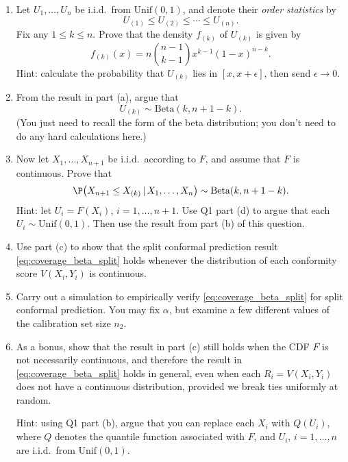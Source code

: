 \documentclass{article}
\begin{document}
\begin{enumerate}[label=(\alph*)]
\item Let $U_1,\dots,U_n$ be i.i.d.\ from $\mathrm{Unif}(0,1)$, and denote their
  \emph{order statistics} by  
  \[
  U_{(1)} \leq U_{(2)} \leq \cdots \leq U_{(n)}.
  \]
  Fix any $1 \leq k \leq n$. Prove that the density $f_{(k)}$ of $U_{(k)}$ is
  given by 
  \marginpar{\small [4 pts]}
  \[
  f_{(k)}(x) = n {n-1 \choose k-1} x^{k-1} (1-x)^{n-k}.
  \]
  Hint: calculate the probability that $U_{(k)}$ lies in $[x,x+\epsilon]$, then
  send $\epsilon \to 0$.
  
\item From the result in part (a), argue that 
  \marginpar{\small [1 pt]}
  \[
  U_{(k)} \sim \mathrm{Beta}(k, n+1-k).
  \]
  (You just need to recall the form of the beta distribution; you don't need to
  do any hard calculations here.)

\item Now let $X_1,\dots,X_{n+1}$ be i.i.d.\ according to $F$, and assume that
  $F$ is continuous. Prove that 
  \marginpar{\small [3 pts]}
  \[
  \P\big( X_{n+1} \leq X_{(k)} \,|\, X_1,\dots,X_n \big) \sim \mathrm{Beta}(k,
  n+1-k). 
  \]
  Hint: let $U_i = F(X_i)$, $i=1,\dots,n+1$. Use Q1 part (d) to argue that each
  $U_i \sim \mathrm{Unif}(0,1)$. Then use the result from part (b) of this
  question.  

\item Use part (c) to show that the split conformal prediction result
  \eqref{eq:coverage_beta_split} holds whenever the distribution of each
  conformity score $V(X_i,Y_i)$ is continuous.  
  \marginpar{\small [2 pts]}

\item Carry out a simulation to empirically verify
  \eqref{eq:coverage_beta_split} for split conformal prediction. You may fix
  $\alpha$, but examine a few different values of the calibration set size
  $n_2$.   
  \marginpar{\small [5 pts]}

\item As a bonus, show that the result in part (c) still holds when the CDF $F$
  is not necessarily continuous, and therefore the result in 
  \eqref{eq:coverage_beta_split} holds in general, even when each $R_i =
  V(X_i,Y_i)$ does not have a continuous distribution, provided we break ties
  uniformly at random. 

  Hint: using Q1 part (b), argue that you can replace each $X_i$ with $Q(U_i)$,
  where $Q$ denotes the quantile function associated with $F$, and $U_i$, 
  $i=1,\dots,n$ are i.i.d.\ from $\mathrm{Unif}(0,1)$.
\end{enumerate}
\end{document}

